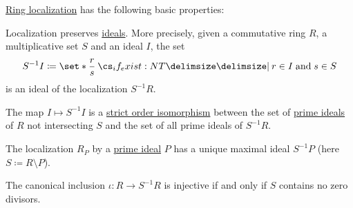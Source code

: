 \begin{proposition}\label{thm:def:ring_localization/properties}
  \hyperref[def:ring_localization]{Ring localization} has the following basic properties:

  \begin{thmenum}
     Localization preserves \hyperref[def:semiring_ideal]{ideals}. More precisely, given a commutative ring \( R \), a multiplicative set \( S \) and an ideal \( I \), the set
    \begin{equation*}
      S^{-1} I \coloneqq \set*{ \frac r s \given* r \in I \T{and} s \in S }
    \end{equation*}
    is an ideal of the localization \( S^{-1} R \).

     The map \( I \mapsto S^{-1} I \) is a \hyperref[def:partially_ordered_set/homomorphism]{strict order isomorphism} between the set of \hyperref[def:ring/submodel]{prime ideals} of \( R \) not intersecting \( S \) and the set of all prime ideals of \( S^{-1} R \).

     The localization \( R_P \) by a \hyperref[def:semiring_ideal/prime]{prime ideal} \( P \) has a unique maximal ideal \( S^{-1} P \) (here \( S \coloneqq R \setminus P \)).

     The canonical inclusion \( \iota: R \to S^{-1} R \) is injective if and only if \( S \) contains no zero divisors.
  \end{thmenum}
\end{proposition}
